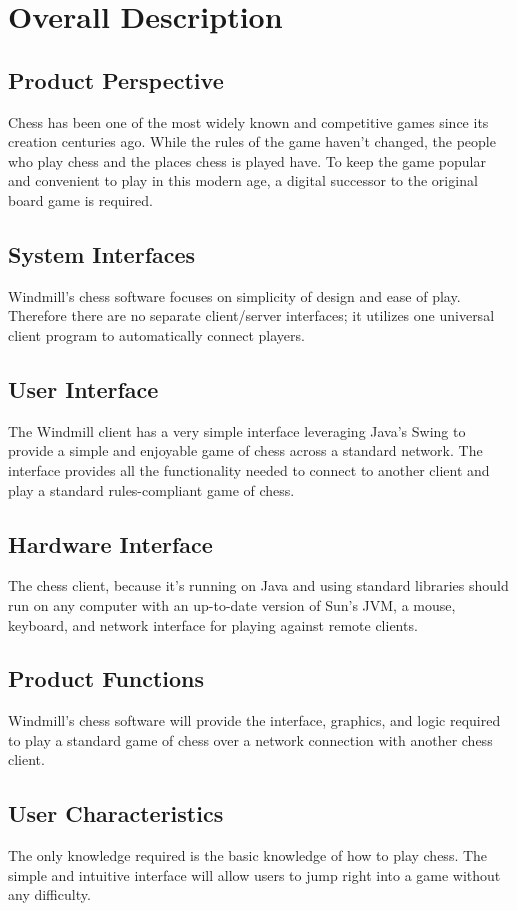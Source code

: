 \section{Overall Description}
\subsection{Product Perspective}
Chess has been one of the most widely known and competitive games since its creation centuries ago.  While the rules of
the game haven't changed, the people who play chess and the places chess is played have.  To keep the game popular and
convenient to play in this modern age, a digital successor to the original board game is required. 

\subsection{System Interfaces}
Windmill's chess software focuses on simplicity of design and ease of play.  Therefore there are no separate
client/server interfaces; it utilizes one universal client program to automatically connect players.

\subsection{User Interface}
The Windmill client has a very simple interface leveraging Java’s Swing to provide a simple and enjoyable game of chess
across a standard network.  The interface provides all the functionality needed to connect to another client and play a
standard rules-compliant game of chess.

\subsection{Hardware Interface}
The chess client, because it’s running on Java and using standard libraries should run on any computer with an
up-to-date version of Sun’s JVM, a mouse, keyboard, and network interface for playing against remote clients.

\subsection{Product Functions}
Windmill’s chess software will provide the interface, graphics, and logic required to play a standard game of chess over
a network connection with another chess client. 

\subsection{User Characteristics}
The only knowledge required is the basic knowledge of how to play chess.  The simple and intuitive interface will allow
users to jump right into a game without any difficulty.
